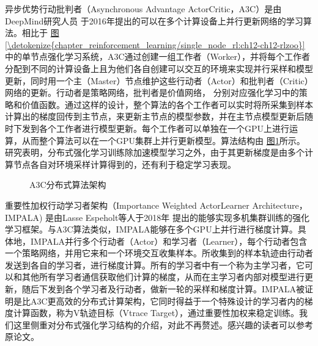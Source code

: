 \documentclass[letterpaper,10pt,english]{sphinxmanual}
\let\sphinxpxdimen\pdfpxdimen\else\newdimen\sphinxpxdimen
\begin{document}
\sphinxAtStartPar
异步优势行动\sphinxhyphen{}批判者（Asynchronous Advantage
Actor\sphinxhyphen{}Critic，A3C）是由DeepMind研究人员
于2016年提出的可以在多个计算设备上并行更新网络的学习算法。相比于
\hyperref[\detokenize{chapter_reinforcement_learning/single_node_rl:ch12-ch12-rlzoo}]{图\ref{\detokenize{chapter_reinforcement_learning/single_node_rl:ch12-ch12-rlzoo}}}中的单节点强化学习系统，A3C通过创建一组工作者（Worker），并将每个工作者分配到不同的计算设备上且为他们各自创建可以交互的环境来实现并行采样和模型更新，同时用一个主（Master）节点维护这些行动者（Actor）和批判者（Critic）网络的更新。行动者是策略网络，批判者是价值网络，
分别对应强化学习中的策略和价值函数。通过这样的设计，整个算法的各个工作者可以实时将所采集到样本计算出的梯度回传到主节点，来更新主节点的模型参数，并在主节点模型更新后随时下发到各个工作者进行模型更新。每个工作者可以单独在一个GPU上进行运算，从而整个算法可以在一个GPU集群上并行更新模型。算法结构由
\hyperref[\detokenize{chapter_reinforcement_learning/distributed_node_rl:ch12-ch12-a3c}]{图\ref{\detokenize{chapter_reinforcement_learning/distributed_node_rl:ch12-ch12-a3c}}}所示。研究表明，分布式强化学习训练除加速模型学习之外，由于其更新梯度是由多个计算节点各自对环境采样计算得到的，还有利于稳定学习表现。

\begin{figure}[H]
\centering
\capstart

\noindent\sphinxincludegraphics[width=800\sphinxpxdimen]{{ch12-a3c}.png}
\caption{A3C分布式算法架构}\label{\detokenize{chapter_reinforcement_learning/distributed_node_rl:id10}}\label{\detokenize{chapter_reinforcement_learning/distributed_node_rl:ch12-ch12-a3c}}\end{figure}

\sphinxAtStartPar
重要性加权行动\sphinxhyphen{}学习者架构（Importance Weighted Actor\sphinxhyphen{}Learner
Architecture，IMPALA) 是由Lasse Espeholt等人于2018年
提出的能够实现多机集群训练的强化学习框架。与A3C算法类似，IMPALA能够在多个GPU上并行进行梯度计算。具体地，IMPALA并行多个行动者（Actor）和学习者（Learner），每个行动者包含一个策略网络，并用它来和一个环境交互收集样本。所收集到的样本轨迹由行动者发送到各自的学习者，进行梯度计算。所有的学习者中有一个称为主学习者，它可以和其他所有学习者通信获取他们计算的梯度，从而在主学习者内部对模型进行更新，随后下发到各个学习者及行动者，做新一轮的采样和梯度计算。IMPALA被证明是比A3C更高效的分布式计算架构，它同时得益于一个特殊设计的学习者内的梯度计算函数，称为V\sphinxhyphen{}轨迹目标（V\sphinxhyphen{}trace
Target），通过重要性加权来稳定训练。我们这里侧重对分布式强化学习结构的介绍，对此不再赘述。感兴趣的读者可以参考原论文。
\end{document}
